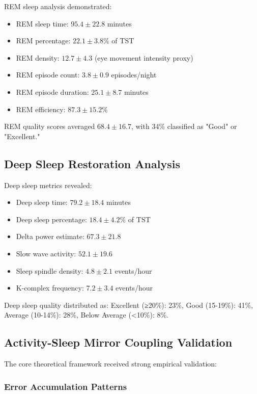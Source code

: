 \documentclass[twocolumn]{article}
\begin{document}
REM sleep analysis demonstrated:

\begin{itemize}
\item REM sleep time: $95.4 \pm 22.8$ minutes
\item REM percentage: $22.1 \pm 3.8\%$ of TST
\item REM density: $12.7 \pm 4.3$ (eye movement intensity proxy)
\item REM episode count: $3.8 \pm 0.9$ episodes/night
\item REM episode duration: $25.1 \pm 8.7$ minutes
\item REM efficiency: $87.3 \pm 15.2\%$
\end{itemize}

REM quality scores averaged $68.4 \pm 16.7$, with 34\% classified as "Good" or "Excellent."

\subsection{Deep Sleep Restoration Analysis}

Deep sleep metrics revealed:

\begin{itemize}
\item Deep sleep time: $79.2 \pm 18.4$ minutes
\item Deep sleep percentage: $18.4 \pm 4.2\%$ of TST
\item Delta power estimate: $67.3 \pm 21.8$
\item Slow wave activity: $52.1 \pm 19.6$
\item Sleep spindle density: $4.8 \pm 2.1$ events/hour
\item K-complex frequency: $7.2 \pm 3.4$ events/hour
\end{itemize}

Deep sleep quality distributed as: Excellent (≥20\%): 23\%, Good (15-19\%): 41\%, Average (10-14\%): 28\%, Below Average (<10\%): 8\%.

\subsection{Activity-Sleep Mirror Coupling Validation}

The core theoretical framework received strong empirical validation:

\subsubsection{Error Accumulation Patterns}
\end{document}
